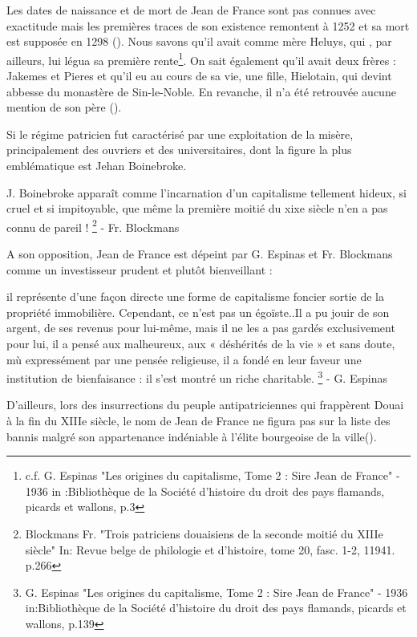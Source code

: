 Les dates de naissance et de mort de Jean de France sont pas connues avec exactitude mais les premières traces de son existence remontent à 1252 et sa mort est supposée en 1298 (\cite{espinas_les_1933}). Nous savons qu'il avait comme mère Heluys, qui , par ailleurs, lui légua sa première rente\footnote{c.f. G. Espinas "Les origines du capitalisme, Tome 2 : Sire Jean de France" - 1936 in :Bibliothèque de la Société
d’histoire du droit des pays flamands, picards et wallons, p.3}.
On sait également qu'il  avait deux frères : Jakemes et Pieres et qu'il eu au cours de sa vie, une fille, Hielotain, qui devint abbesse du monastère de Sin-le-Noble. En revanche, il n'a été retrouvée aucune mention de son père (\cite{espinas_les_1933}).

Si le régime patricien fut caractérisé par une exploitation de la misère, principalement des ouvriers et des universitaires, dont la figure la plus emblématique est Jehan Boinebroke. 
\begin{displayquote} 
    \og J. Boinebroke apparaît comme l'incarnation d'un capitalisme tellement hideux, si cruel et si impitoyable, que même la première moitié du xixe siècle n'en a pas connu de pareil ! \fg{}\footnote{ Blockmans Fr. "Trois patriciens douaisiens de la seconde moitié du XIIIe siècle" In: Revue belge de philologie et d'histoire, tome 20, fasc. 1-2, 11941. p.266} - Fr. Blockmans
\end{displayquote}
\vspace{0,5cm}
A son opposition, Jean de France est dépeint par G. Espinas et Fr. Blockmans comme un investisseur prudent et plutôt bienveillant :
\begin{displayquote}
    \og [...] il représente d’une façon directe une forme de capitalisme foncier sortie de la propriété immobilière. Cependant, ce n’est pas un égoïste..Il a pu jouir de son argent, de ses revenus pour lui-même, mais il ne les a pas gardés exclusivement pour lui, il a pensé aux malheureux, aux « déshérités de la vie » et sans doute, mù expressément par une pensée religieuse, il a fondé en leur faveur une institution de bienfaisance : il s’est montré un riche charitable.\fg{} 
    \footnote{ G. Espinas "Les origines du capitalisme, Tome 2 : Sire Jean de France" - 1936 in:Bibliothèque de la Société d'histoire du droit des pays flamands, picards et wallons, p.139 }
    - G. Espinas
\end{displayquote} 
\vspace{0,5cm}
D'ailleurs, lors des insurrections du peuple antipatriciennes qui frappèrent Douai à la fin du XIIIe siècle, le nom de Jean de France ne figura pas sur la liste des bannis malgré son appartenance indéniable à l'élite bourgeoise de la ville(\cite{espinas_les_1933}).

